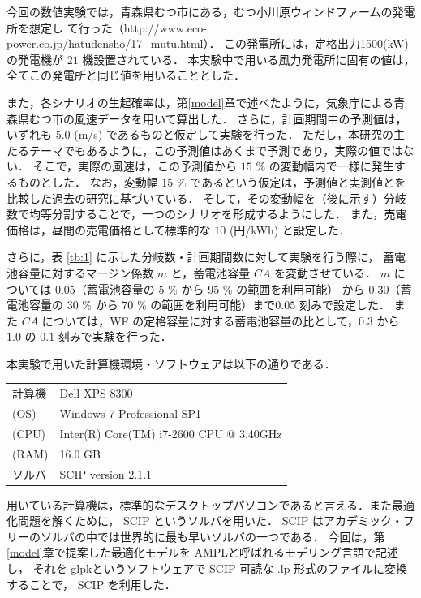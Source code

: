 \documentclass[a4paper,12pt,showkeys]{jreport}
\begin{document}
今回の数値実験では，青森県むつ市にある，むつ小川原ウィンドファームの発電所を想定し
て行った（http://www.eco-power.co.jp/hatudensho/17\_mutu.html）．
この発電所には，定格出力1500(kW)の発電機が $21$ 機設置されている．
本実験中で用いる風力発電所に固有の値は，全てこの発電所と同じ値を用いることとした．

また，各シナリオの生起確率は，第\ref{model}章で述べたように，気象庁による青森県むつ市の風速データを用いて算出した．
さらに，計画期間中の予測値は，いずれも $5.0$ (m/s) であるものと仮定して実験を行った．
ただし，本研究の主たるテーマでもあるように，この予測値はあくまで予測であり，実際の値ではない．
そこで，実際の風速は，この予測値から $15$ \% の変動幅内で一様に発生するものとした．
なお，変動幅 $15$ \% であるという仮定は，予測値と実測値とを比較した過去の研究\cite{徳谷}に基づいている．
そして，その変動幅を（後に示す）分岐数で均等分割することで，一つのシナリオを形成するようにした．
また，売電価格は，昼間の売電価格として標準的な $10$ (円/kWh) と設定した．

さらに，表 \ref{tb:1} に示した分岐数・計画期間数に対して実験を行う際に，
蓄電池容量に対するマージン係数 $m$ と，蓄電池容量 $CA$ を変動させている．
$m$ については $0.05$（蓄電池容量の $5$ \% から $95$ \% の範囲を利用可能）
から $0.30$（蓄電池容量の $30$ \% から $70$ \% の範囲を利用可能）まで$0.05$ 刻みで設定した．
また $CA$ については，WF の定格容量に対する蓄電池容量の比として，$0.3$ から $1.0$ の $0.1$ 刻みで実験を行った．

本実験で用いた計算機環境・ソフトウェアは以下の通りである．
%
\begin{table}[h]
\begin{center}
  \begin{tabular}{|l|l|}
  \hline
  計算機 & Dell XPS 8300 \\
  (OS) & Windows 7 Professional SP1 \\
  (CPU) & Inter(R) Core(TM) i7-2600 CPU @ 3.40GHz \\
  (RAM) & 16.0 GB \\
  \hline
  ソルバ & SCIP version 2.1.1 \\
  \hline
  \end{tabular}
\end{center}
\end{table}
%

用いている計算機は，標準的なデスクトップパソコンであると言える．また最適化問題を解くために，
SCIP \cite{SCIP}というソルバを用いた．
SCIP はアカデミック・フリーのソルバの中では世界的に最も早いソルバの一つである．
今回は，第\ref{model}章で提案した最適化モデルを
AMPL\cite{AMPL}と呼ばれるモデリング言語で記述し，
それを glpk\cite{GLPK}というソフトウェアで SCIP 可読な .lp 形式のファイルに変換することで，
SCIP を利用した．
\end{document}

